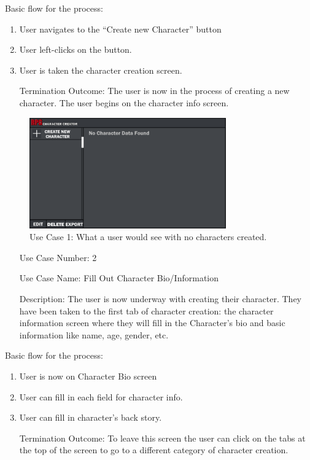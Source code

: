 \documentclass[10pt,conference,onecolumn,compsoc]{IEEEtran}
\begin{document}
Basic flow for the process:

\begin{enumerate}
\item User navigates to the “Create new Character” button
\item User left-clicks on the button.
\item User is taken the character creation screen.
\item[Termination Outcome:] The user is now in the process of creating a new character. The user begins on the character info screen.
\end{enumerate}

\begin{figure}[ht!]
\includegraphics[height=180px, width=320px]{CSCI 352 Interface Mockups/Interface Mockup 0.5.png}
\caption{Use Case 1: What a user would see with no characters created.}
\centering
\label{mockup0.5}
\end{figure}

\begin{itemize}
\item[Use Case Number:] 2
\item[Use Case Name:] Fill Out Character Bio/Information
\item[Description:] The user is now underway with creating their character. They have been taken to the first tab of character creation: the character information screen where they will fill in the Character's bio and basic information like name, age, gender, etc.
\end{itemize}
Basic flow for the process:
\begin{enumerate}
\item User is now on Character Bio screen
\item User can fill in each field for character info.
\item User can fill in character's back story.
\item[Termination Outcome:] To leave this screen the user can click on the tabs at the top of the screen to go to a different category of character creation.
\end{enumerate}
\end{document}
